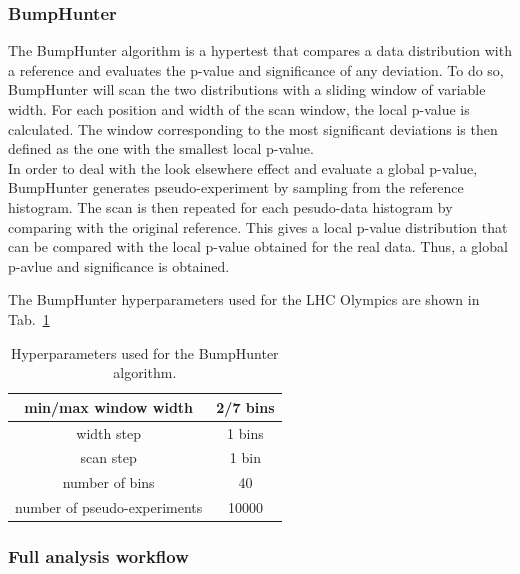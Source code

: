\documentclass[letterpaper,11pt]{article}
\begin{document}
\subsubsection{BumpHunter}
\label{sec:BH}

\noindent The BumpHunter algorithm is a hypertest that compares a data distribution with a reference and evaluates the p-value and significance of any deviation.
To do so, BumpHunter will scan the two distributions with a sliding window of variable width.
For each position and width of the scan window, the local p-value is calculated. The window corresponding to the most significant deviations is then defined as the one with the smallest local p-value.\\

\noindent In order to deal with the look elsewhere effect and evaluate a global p-value, BumpHunter generates pseudo-experiment by sampling from the reference histogram.
The scan is then repeated for each pesudo-data histogram by comparing with the original reference.
This gives a local p-value distribution that can be compared with the local p-value obtained for the real data.
Thus, a global p-avlue and significance is obtained.

\noindent The BumpHunter hyperparameters used for the LHC Olympics are shown in Tab.~\ref{tab:param_BH}
\begin{table}[h!]
	\centering
	\begin{tabular}{|c|c|}
		\hline
		min/max window width & 2/7 bins \\
		\hline
		width step & 1 bins \\
		\hline
		scan step & 1 bin \\
		\hline
		number of bins & 40 \\
		\hline
		number of pseudo-experiments & 10000 \\
		\hline
	\end{tabular}
	\caption{Hyperparameters used for the BumpHunter algorithm.}
	\label{tab:param_BH}
\end{table}

\subsubsection{Full analysis workflow}
\end{document}
